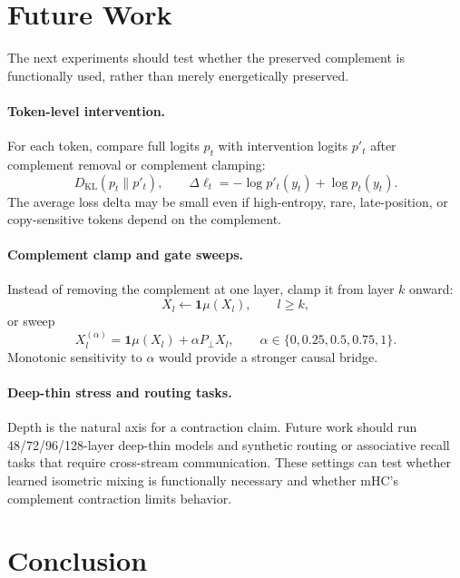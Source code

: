 \documentclass[10pt]{article}
\newcommand{\one}{\mathbf{1}}
\newcommand{\pperp}{P_{\perp}}
\begin{document}
\section{Future Work}

The next experiments should test whether the preserved complement is
functionally used, rather than merely energetically preserved.

\paragraph{Token-level intervention.}
For each token, compare full logits $p_t$ with intervention logits $p'_t$ after
complement removal or complement clamping:
\begin{equation}
    D_{\mathrm{KL}}(p_t\|p'_t),\qquad
    \Delta\ell_t = -\log p'_t(y_t)+\log p_t(y_t).
\end{equation}
The average loss delta may be small even if high-entropy, rare, late-position,
or copy-sensitive tokens depend on the complement.

\paragraph{Complement clamp and gate sweeps.}
Instead of removing the complement at one layer, clamp it from layer $k$ onward:
\begin{equation}
    X_l\leftarrow \one\mu(X_l),\qquad l\ge k,
\end{equation}
or sweep
\begin{equation}
    X_l^{(\alpha)}=\one\mu(X_l)+\alpha\pperp X_l,\qquad
    \alpha\in\{0,0.25,0.5,0.75,1\}.
\end{equation}
Monotonic sensitivity to $\alpha$ would provide a stronger causal bridge.

\paragraph{Deep-thin stress and routing tasks.}
Depth is the natural axis for a contraction claim.  Future work should run
48/72/96/128-layer deep-thin models and synthetic routing or associative recall
tasks that require cross-stream communication.  These settings can test whether
learned isometric mixing is functionally necessary and whether mHC's complement
contraction limits behavior.

\section{Conclusion}
\end{document}
